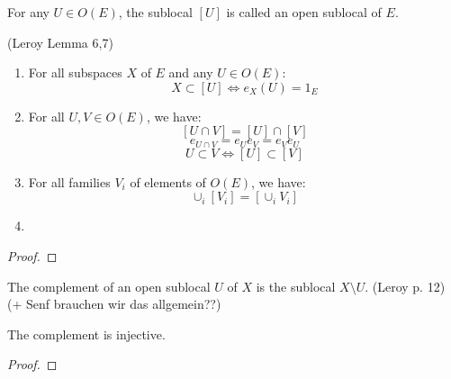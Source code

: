 \begin{definition}
    \label{def:open_sublocal}
    \leanok
    For any $U \in O(E)$, the sublocal $[U]$ is called an open sublocal of $E$.
\end{definition}


\begin{lemma}
(Leroy Lemma 6,7)
    \label{lem:sublocal_properties}
    \leanok
    \begin{enumerate}
        \item For all subspaces $X$ of $E$ and any $U \in O(E)$:
        \[X \subset [U] \iff e_X(U) = 1_E\]

        \item For all $U, V \in O(E)$, we have:
        \[[U \cap V] = [U] \cap [V]\]
        \[e_{U \cap V} = e_Ue_V=e_Ve_U\]
        \[U \subset V \iff [U] \subset [V]\]
        \item
        For all families $V_i$ of elements of $O(E)$, we have:
        \[\cup_i[V_i] = [\cup_iV_i]\]

        \item
    \end{enumerate}
\end{lemma}
\begin{proof}
    \leanok
\end{proof}


\begin{definition}[Complement]
    \label{def:complement}
    \leanok
    The complement of an open sublocal $U$ of $X$ is the sublocal $X \setminus U$.
    (Leroy p. 12) (+ Senf brauchen wir das allgemein??)
\end{definition}

\begin{lemma}
    \label{lem:complement_injective}
    \leanok
    The complement is injective.
\end{lemma}
\begin{proof}
    \leanok
\end{proof}

